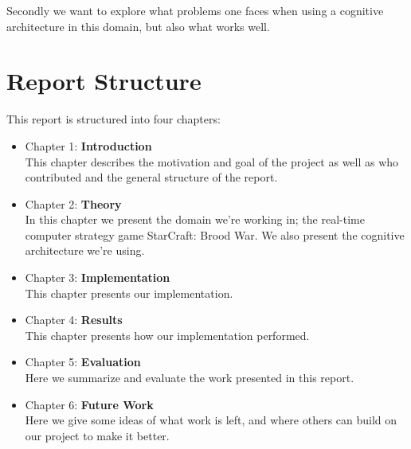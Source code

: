 Secondly we want to explore what problems one faces when using a cognitive architecture in this domain, but also what works well.

\section{Report Structure}
\label{sec:structure}
This report is structured into four chapters:
\begin{itemize}
\item Chapter 1: \textbf{Introduction} \\
This chapter describes the motivation and goal of the project as well as who
contributed and the general structure of the report.
\item Chapter 2: \textbf{Theory} \\
In this chapter we present the domain we're working in; the real-time computer strategy game StarCraft: Brood War. We also present the cognitive architecture we're using.
\item Chapter 3: \textbf{Implementation} \\
This chapter presents our implementation.
\item Chapter 4: \textbf{Results} \\
This chapter presents how our implementation performed.
\item Chapter 5: \textbf{Evaluation} \\
Here we summarize and evaluate the work presented in this report.
\item Chapter 6: \textbf{Future Work} \\
Here we give some ideas of what work is left, and where others can build on our project to make it better.

\end{itemize}